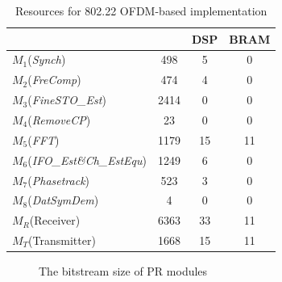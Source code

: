 \begin{table}[hb]
	\centering
	\caption{Resources for 802.22 OFDM-based implementation}
	\label{tab:Resouces}
	\begin{tabular}{l|c|c|c}
        \hline \hline
    			  \makebox[1.2cm][c]{$modules$}	&  \makebox[1cm][c]{Slices}  &  {DSP} &  {BRAM} \\
	\hline
		$M_1$(\textit{Synch})     				& 498 		& 5	& 0 \\
		$M_2$(\textit{FreComp})				& 474		& 4 	& 0 \\
		$M_3$(\textit{FineSTO\_Est})			& 2414	& 0 	& 0 \\
		$M_4$(\textit{RemoveCP})			& 23  		& 0	& 0 \\
		$M_5$(\textit{FFT})	  			& 1179  	& 15	& 11 \\
		$M_6$(\textit{IFO\_Est\&Ch\_EstEqu})	  	& 1249 	& 6	& 0 \\
		$M_7$(\textit{Phasetrack})	  		& 523  	& 3	& 0 \\
		$M_8$(\textit{DatSymDem})	  		& 4	  	& 0	& 0 \\
		$M_R$(Receiver)  					& 6363  	& 33	& 11 \\
		$M_T$(Transmitter)					& 1668  	& 15	& 11 \\
	\hline \hline
    \end{tabular}
\end{table}

\begin{figure}
\centering
{}
\caption{The bitstream size of PR modules}
\label{fig:Bitstream}
\end{figure}

